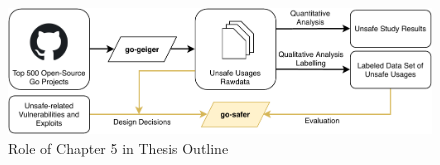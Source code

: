 \begin{figure}[ht]
    \includegraphics[width=\textwidth]{assets/figures/chapter5/outline5.pdf}
    \caption{Role of Chapter 5 in Thesis Outline}
    \label{fig:outline5}
\end{figure}
